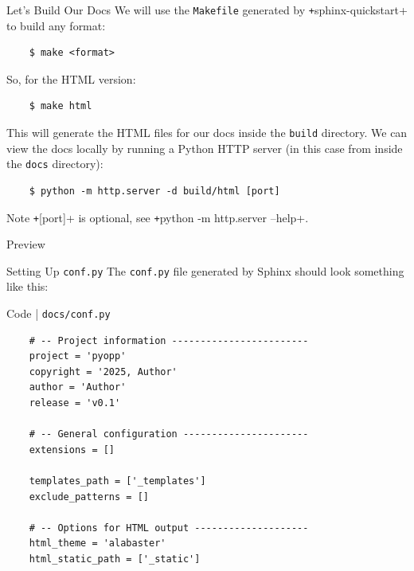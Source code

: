 \begin{frame}[fragile]{Let's Build Our Docs}
  We will use the \texttt{Makefile} generated by \texttt+sphinx-quickstart+ to build any format:
  \begin{verbatim}
    $ make <format>
  \end{verbatim}
  So, for the HTML version:
  \begin{verbatim}
    $ make html
  \end{verbatim}
  This will generate the HTML files for our docs inside the \texttt{build} directory.
  We can view the docs locally by running a Python HTTP server (in this case from inside the \texttt{docs} directory):
  \begin{verbatim}
    $ python -m http.server -d build/html [port]
  \end{verbatim}

  \begin{block}{Note}
    \texttt+[port]+ is optional, see \texttt+python -m http.server --help+.
  \end{block}
\end{frame}


\begin{frame}[fragile]{Preview}
\end{frame}

\begin{frame}[fragile]{Setting Up \texttt{conf.py}}
  The \texttt{conf.py} file generated by Sphinx should look something like this:
  \begin{block}{Code | \texttt{docs/conf.py}}
  \begin{verbatim}
    # -- Project information ------------------------
    project = 'pyopp'
    copyright = '2025, Author'
    author = 'Author'
    release = 'v0.1'

    # -- General configuration ----------------------
    extensions = []

    templates_path = ['_templates']
    exclude_patterns = []

    # -- Options for HTML output --------------------
    html_theme = 'alabaster'
    html_static_path = ['_static']
  \end{verbatim}
  \end{block}
\end{frame}

